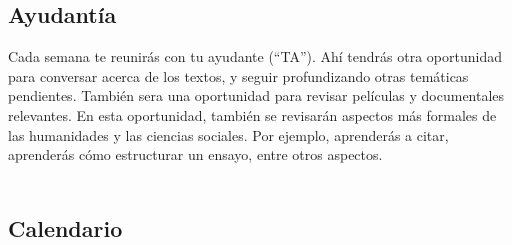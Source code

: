 \documentclass[letterpaper]{article}
\renewenvironment{itemize}{
  \begin{list}{}{
    \setlength{\leftmargin}{1.5em}
  }
}{
  \end{list}
}
\begin{document}
\subsection*{Ayudant\'ia}

\begin{itemize}
    \item[\Pointinghand] {\color{blue}{\bf Las ayudant\'ias comienzan la semana del 1 de abril.}}
\end{itemize}



Cada semana te reunir\'as con tu ayudante (``TA''). Ah\'i tendr\'as otra oportunidad para conversar acerca de los textos, y seguir profundizando otras tem\'aticas pendientes. Tambi\'en sera una oportunidad para revisar pel\'iculas y documentales relevantes. En esta oportunidad, tambi\'en se revisar\'an aspectos m\'as formales de las humanidades y las ciencias sociales. Por ejemplo, aprender\'as a citar, aprender\'as c\'omo estructurar un ensayo, entre otros aspectos.
\\
\\

\subsection*{Calendario}

\end{document}
